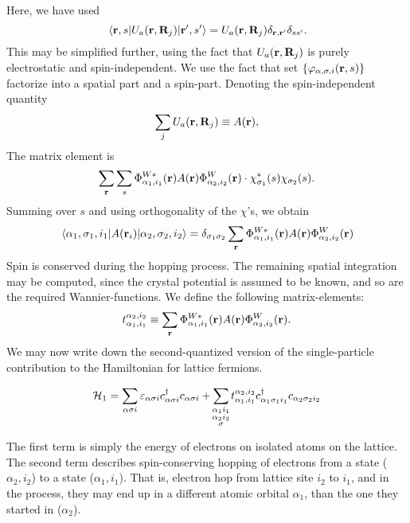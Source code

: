 Here, we have used
\begin{equation}
	\mel{\vb{r},s}{U_a(\vb{r},\vb{R}_j)}{\vb{r}',s'}= U_a(\vb{r},\vb{R}_j)\delta_{\vb{r},\vb{r}'}\delta_{ss'}.
\end{equation}
This may be simplified further, using the fact that $U_a(\vb{r},\vb{R}_j)$ is purely electrostatic and spin-independent.
We use the fact that set $\{\varphi_{\alpha, \sigma,i}(\vb{r},s)\}$ factorize into a spatial part and a spin-part.
Denoting the spin-independent quantity
\begin{equation}
	\sum_j U_a(\vb{r},\vb{R}_j) \equiv A(\vb{r}),
\end{equation}
The matrix element is
\begin{equation}
	\sum_{\vb{r}}\sum_s \Phi_{\alpha_1, i_1}^{W*} (\vb{r}) A(\vb{r})\Phi_{\alpha_2, i_2}^W(\vb r) \cdot \chi_{\sigma_1}^* (s)\chi_{\sigma_2} (s).
\end{equation}
Summing over $s$ and using orthogonality of the $\chi$'s, we obtain
\begin{equation}
	\mel{\alpha_1,\sigma_1,i_1}{A(\vb{r}_i)}{\alpha_2,\sigma_2,i_2} = \delta_{\sigma_1\sigma_2}\sum_{\vb r}\Phi_{\alpha_1, i_1}^{W*}(\vb r)A(\vb r)\Phi_{\alpha_2, i_2}^{W}(\vb r)
\end{equation}
Spin is conserved during the hopping process.
The remaining spatial integration may be computed, since the crystal potential is assumed to be known, and so are the required Wannier-functions.
We define the following matrix-elements:
\begin{equation}
	t_{\alpha_1,i_1}^{\alpha_2,i_2} \equiv \sum_{\vb r}\Phi_{\alpha_1, i_1}^{W*}(\vb r)A(\vb r)\Phi_{\alpha_2, i_2}^{W}(\vb r).
\end{equation}
We may now write down the second-quantized version of the single-particle contribution to the Hamiltonian for lattice fermions.
\begin{tcolorbox}
	\begin{align}
		\Ha_1 = \sum_{\alpha\sigma i} \ep_{\alpha\sigma i}\cd_{\alpha\sigma i}c_{\alpha\sigma i} + \sum_{\mathclap{\substack{\alpha_1 i_1 \\ \alpha_2 i_2 \\ \sigma}}} t_{\alpha_1,i_1}^{\alpha_2,i_2}\cd_{\alpha_1\sigma_1 i_1}c_{\alpha_2\sigma_2 i_2}
	\end{align}
\end{tcolorbox}
The first term is simply the energy of electrons on isolated atoms on the lattice. The second term describes spin-conserving hopping of electrons from a state ($\alpha_2, i_2$) to a state ($\alpha_1, i_1$). That is, electron hop from lattice site $i_2$ to $i_1$, and in the process, they may end up in a different atomic orbital $\alpha_1$, than the one they started in ($\alpha_2$).

